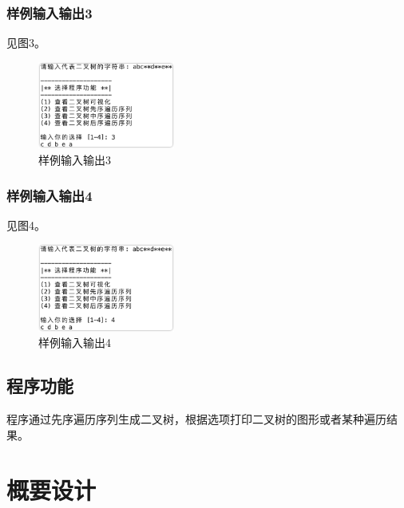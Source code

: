 \documentclass{article}
\begin{document}
\subsubsection{样例输入输出3}

见图3。

\begin{figure}[htbp]

    \centering\includegraphics[width=0.4\textwidth]{./Images/sample3.png}

    \caption{样例输入输出3}

\end{figure}

\subsubsection{样例输入输出4}

见图4。

\begin{figure}[htbp]

    \centering\includegraphics[width=0.4\textwidth]{./Images/sample4.png}

    \caption{样例输入输出4}

\end{figure}

\subsection{程序功能}

程序通过先序遍历序列生成二叉树，根据选项打印二叉树的图形或者某种遍历结果。

\section{概要设计}
\end{document}
